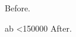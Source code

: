 \documentclass{article}
\begin{document}
Before.\par
\loop\hbox{a}\hbox{b}\advance{} \ifnum\n<150000 \repeat
After.
\end{document}
